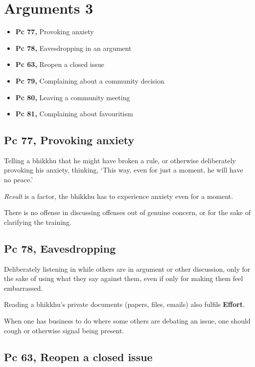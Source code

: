 \chapter{Arguments 3}

\begin{itemize}
\tightlist
\item
  \textbf{Pc 77,} Provoking anxiety
\item
  \textbf{Pc 78,} Eavesdropping in an argument
\item
  \textbf{Pc 63,} Reopen a closed issue
\item
  \textbf{Pc 79,} Complaining about a community decision
\item
  \textbf{Pc 80,} Leaving a community meeting
\item
  \textbf{Pc 81,} Complaining about favouritism
\end{itemize}

\section{Pc 77, Provoking anxiety}

Telling a bhikkhu that he might have broken a rule, or otherwise
deliberately provoking his anxiety, thinking, `This way, even for just a
moment, he will have no peace.'

\emph{Result} is a factor, the bhikkhu has to experience anxiety even
for a moment.

There is no offense in discussing offenses out of genuine concern, or
for the sake of clarifying the training.

\section{Pc 78, Eavesdropping}

Deliberately listening in while others are in argument or other
discussion, only for the sake of using what they say against them, even
if only for making them feel embarrassed.

Reading a bhikkhu's private documents (papers, files, emails) also
fulfils \textbf{Effort}.

When one has business to do where some others are debating an issue, one
should cough or otherwise signal being present.

\section{Pc 63, Reopen a closed issue}


